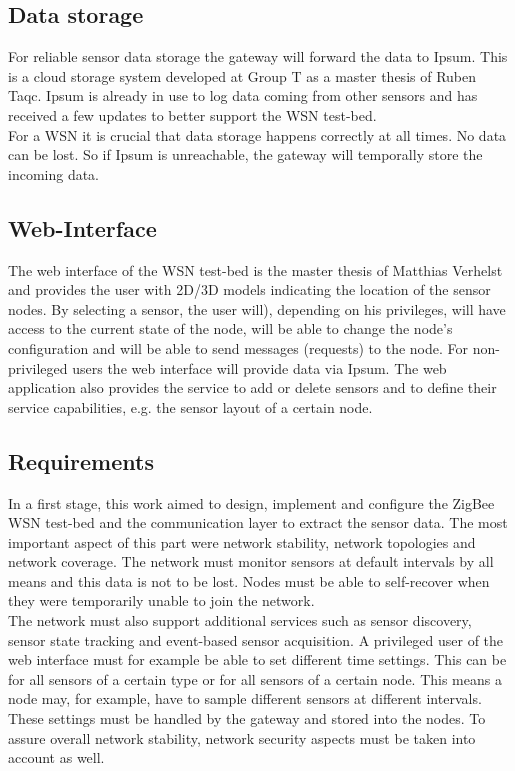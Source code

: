 \subsection{Data storage} 
For reliable sensor data storage the gateway will forward the data to Ipsum. This is a cloud storage system developed at Group T as a master thesis of Ruben Taqc. Ipsum is already in use to log data coming from other sensors and has received a few updates to better support the WSN test-bed.\\
For a WSN it is crucial that data storage happens correctly at all times. No data can be lost. So if Ipsum is unreachable, the gateway will temporally store the incoming data.

\subsection{Web-Interface}
The web interface of the WSN test-bed is the master thesis of Matthias Verhelst and provides the user with 2D/3D models indicating the location of the sensor nodes. By selecting a sensor, the user will), depending on his privileges, will have access to the current state of the node, will be able to change the node's configuration and will be able to send messages (requests) to the node. For non-privileged users the web interface will provide data via Ipsum. The web application also provides the service to add or delete sensors and to define their service capabilities, e.g. the sensor layout of a certain node.

\subsection{Requirements}
In a first stage, this work aimed to design, implement and configure the ZigBee WSN test-bed and the communication layer to extract the sensor data. The most important aspect of this part were network stability, network topologies and network coverage. The network must monitor sensors at default intervals by all means and this data is not to be lost. Nodes must be able to self-recover when they were temporarily unable to join the network.\\
The network must also support additional services such as sensor discovery, sensor state tracking and event-based sensor acquisition. A privileged user of the web interface must for example be able to set different time settings. This can be for all sensors of a certain type or for all sensors of a certain node. This means a node may, for example, have to sample different sensors at different intervals. These settings must be handled by the gateway and stored into the nodes.  To assure overall network stability, network security aspects must be taken into account as well.
